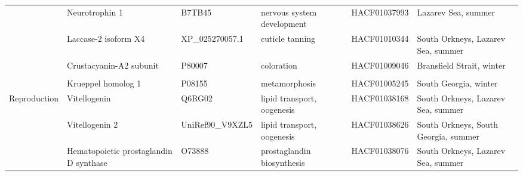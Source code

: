 {\begin{longtable}{@{}L{1.8cm}L{3cm}L{2cm}L{2.5cm}L{1.75cm}L{2.5cm}@{}}
                                       & Neurotrophin 1                                                          & B7TB45                                  & nervous system development                                                                           & HACF01037993       & Lazarev Sea, summer                  \\
                                       & Laccase-2 isoform X4                                                    & XP\_025270057.1                         & cuticle tanning                                                                                      & HACF01010344       & South Orkneys, Lazarev Sea, summer   \\
                                       & Crustacyanin-A2 subunit                                                 & P80007                                  & coloration                                                                                           & HACF01009046       & Bransfield Strait, winter            \\
                                       &                                                                         &                                         &                                                                                                      &                    &                                      \\
                                       & Krueppel homolog 1                                                      & P08155                                  & metamorphosis                                                                                        & HACF01005245       & South Georgia, winter                \\* \midrule
Reproduction                           & Vitellogenin                                                            & Q6RG02                                  & lipid transport, oogenesis                                                                           & HACF01038168       & South Orkneys, Lazarev Sea, summer   \\
                                       & Vitellogenin 2                                                          & UniRef90\_V9XZL5                        & lipid transport, oogenesis                                                                           & HACF01038626       & South Orkneys, South Georgia, summer \\
                                       & Hematopoietic prostaglandin D synthase                                  & O73888                                  & prostaglandin biosynthesis                                                                           & HACF01038076       & South Orkneys, Lazarev Sea, summer   \\

\end{longtable}}
